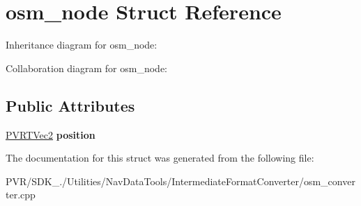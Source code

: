 \hypertarget{structosm__node}{\section{osm\+\_\+node Struct Reference}
\label{structosm__node}
}


Inheritance diagram for osm\+\_\+node\+:


Collaboration diagram for osm\+\_\+node\+:
\subsection*{Public Attributes}
\begin{DoxyCompactItemize}
\item 
\hypertarget{structosm__node_af5e601d16de35be371574f697f85f8d3}{\hyperlink{struct_p_v_r_t_vec2}{P\+V\+R\+T\+Vec2} {\bfseries position}}\label{structosm__node_af5e601d16de35be371574f697f85f8d3}

\end{DoxyCompactItemize}


The documentation for this struct was generated from the following file\+:\begin{DoxyCompactItemize}
\item 
P\+V\+R/\+S\+D\+K\+\_./\+Utilities/\+Nav\+Data\+Tools/\+Intermediate\+Format\+Converter/osm\+\_\+converter.\+cpp\end{DoxyCompactItemize}
